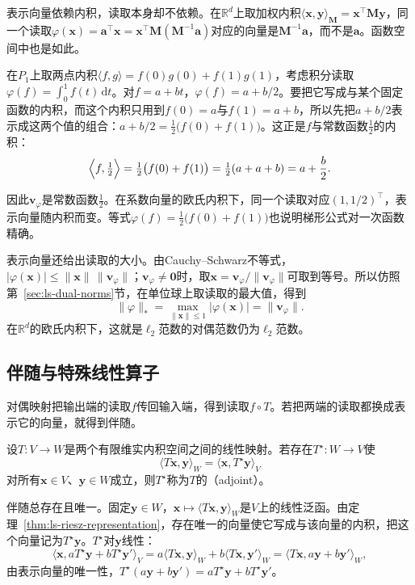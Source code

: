 表示向量依赖内积，读取本身却不依赖。在$\mathbb R^d$上取加权内积$\langle\bm x,\bm y\rangle_{\bm M}=\bm x^\top\bm M\bm y$，同一个读取$\varphi(\bm x)=\bm a^\top\bm x=\bm x^\top\bm M(\bm M^{-1}\bm a)$对应的向量是$\bm M^{-1}\bm a$，而不是$\bm a$。函数空间中也是如此。
\begin{example}[积分读取在两点内积下的表示向量]
\label{ex:ls-riesz-integral-two-point}
在$P_1$上取两点内积$\langle f,g\rangle=f(0)g(0)+f(1)g(1)$，考虑积分读取$\varphi(f)=\int_0^1f(t)\,\mathrm dt$。对$f=a+bt$，$\varphi(f)=a+b/2$。要把它写成与某个固定函数的内积，而这个内积只用到$f(0)=a$与$f(1)=a+b$，所以先把$a+b/2$表示成这两个值的组合：$a+b/2=\tfrac12\bigl(f(0)+f(1)\bigr)$。这正是$f$与常数函数$\tfrac12$的内积：
\[
 \Bigl\langle f,\tfrac12\Bigr\rangle=\tfrac12\bigl(f(0)+f(1)\bigr)=\tfrac12(a+a+b)=a+\frac b2 .
\]

因此$\bm v_\varphi$是常数函数$\tfrac12$。在系数向量的欧氏内积下，同一个读取对应$(1,1/2)^\top$，表示向量随内积而变。等式$\varphi(f)=\tfrac12\bigl(f(0)+f(1)\bigr)$也说明梯形公式对一次函数精确。
\end{example}
表示向量还给出读取的大小。由Cauchy--Schwarz不等式，$|\varphi(\bm x)|\leq\lVert\bm x\rVert\,\lVert\bm v_\varphi\rVert$；$\bm v_\varphi\neq\bm0$时，取$\bm x=\bm v_\varphi/\lVert\bm v_\varphi\rVert$可取到等号。所以仿照第~\ref{sec:ls-dual-norms}节，在单位球上取读取的最大值，得到
\[
 \lVert\varphi\rVert_*=\max_{\lVert\bm x\rVert\leq1}|\varphi(\bm x)|=\lVert\bm v_\varphi\rVert .
\]
在$\mathbb R^d$的欧氏内积下，这就是$\ell_2$范数的对偶范数仍为$\ell_2$范数。

\subsection{伴随与特殊线性算子}
对偶映射把输出端的读取$f$传回输入端，得到读取$f\circ T$。若把两端的读取都换成表示它的向量，就得到伴随。
\begin{definition}[伴随]
\label{def:linear-algebra-adjoint}
设$T:V\to W$是两个有限维实内积空间之间的线性映射。若存在$T^\star:W\to V$使
\begin{equation}
 \langle T\bm x,\bm y\rangle_W=\langle\bm x,T^\star\bm y\rangle_V
 \label{eq:ls-adjoint-pairing}
\end{equation}
对所有$\bm x\in V$、$\bm y\in W$成立，则$T^\star$称为$T$的（adjoint）。
\end{definition}

伴随总存在且唯一。固定$\bm y\in W$，$\bm x\mapsto\langle T\bm x,\bm y\rangle_W$是$V$上的线性泛函。由定理~\ref{thm:ls-riesz-representation}，存在唯一的向量使它写成与该向量的内积，把这个向量记为$T^\star\bm y$。$T^\star$对$\bm y$线性：
\[
 \langle\bm x,aT^\star\bm y+bT^\star\bm y'\rangle_V=a\langle T\bm x,\bm y\rangle_W+b\langle T\bm x,\bm y'\rangle_W=\langle T\bm x,a\bm y+b\bm y'\rangle_W,
\]
由表示向量的唯一性，$T^\star(a\bm y+b\bm y')=aT^\star\bm y+bT^\star\bm y'$。

